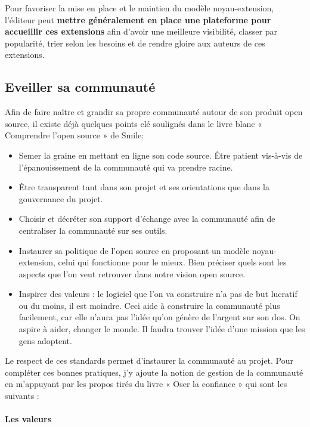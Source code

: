 				Pour favoriser la mise en place et le maintien du modèle noyau-extension, l'éditeur peut \textbf{mettre généralement en place une plateforme pour accueillir ces extensions} afin d'avoir une meilleure visibilité, classer par popularité, trier selon les besoins et de rendre gloire aux auteurs de ces extensions.
			
		\subsection{Eveiller sa communauté}

			Afin de faire naître et grandir sa propre communauté autour de son produit open source, il existe déjà quelques points clé soulignés dans le livre blanc « Comprendre l'open source » de Smile:

			\begin{itemize}[label=\textbullet, font=\LARGE \color{burntorange}]
				\item Semer la graine en mettant en ligne son code source. Être patient vis-à-vis de l'épanouissement de la communauté qui va prendre racine.
				\item Être transparent tant dans son projet et ses orientations que dans la gouvernance du projet.
				\item Choisir et décréter son support d'échange avec la communauté afin de centraliser la communauté sur ses outils.
				\item Instaurer sa politique de l'open source en proposant un modèle noyau-extension, celui qui fonctionne pour le mieux. Bien préciser quels sont les aspects que l'on veut retrouver dans notre vision open source.
				\item Inspirer des valeurs : le logiciel que l'on va construire n'a pas de but lucratif ou du moins, il est moindre. Ceci aide à construire la communauté plus facilement, car elle n'aura pas l'idée qu'on génère de l'argent sur son dos. On aspire à aider, changer le monde. Il faudra trouver l'idée d'une mission que les gens adoptent.
			\end{itemize}

			Le respect de ces standards permet d'instaurer la communauté au projet. Pour compléter ces bonnes pratiques, j'y ajoute la notion de gestion de la communauté en m'appuyant par les propos tirés du livre « Oser la confiance » qui sont les suivants :

			\paragraph{Les valeurs\\}

